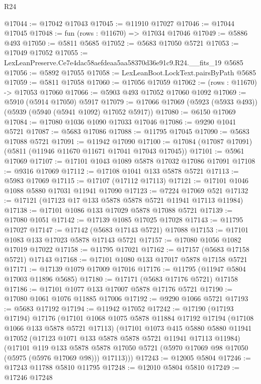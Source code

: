 \begin{lexlean}{R24}
\begin{coremodule}
@17044 := @17042 @17043
@17045 := @11910 @17027
@17046 := @17044 @17045
@17048 := fun (rows : @11670) => @17034 @17046
@17049 := @5886 @493
@17050 := @5811 @5685
@17052 := @5683 @17050 @5721
@17053 := @17049 @17052
@17055 := LexLeanPreserve.Ce7e4dac58aefdeaa5aa58370d36e91c9.R24.__fits_19 @5685
@17056 := @5892 @17055
@17058 := LexLeanBoot.LockText.pairsByPath @5685
@17059 := @5811 @17058
@17060 := @17056 @17059
@17062 := (rows : @11670) -> @17053 @17060
@17066 := @5903 @493 @17052 @17060 @1092
@17069 := @5910 (@5914 @17050) @5917
@17079 := @17066 @17069 (@5923 (@5933 @493)) (@5939 (@5940 (@5941 @1092) @17052 @5917))
@17080 := @6150 @17069
@17084 := @17080 @1036 @1090 @17033 @17046
@17086 := @9290 @1041 @5721
@17087 := @5683 @17086
@17088 := @11795 @17045
@17090 := @5683 @17088 @5721
@17091 := @11942 @17090
@17100 := @17084 (@17087 @17091) (@5811 (@11946 @11670 @11671 @17041 @17043 @17045))
@17101 := @5961 @17069
@17107 := @17101 @1043 @1089 @5878 @17032 @17086 @17091
@17108 := @9316 @17069
@17112 := @17108 @1041 @133 @5878 @5721
@17113 := @5983 @17069
@17115 := @17107 (@17112 @17113)
@17121 := @17101 @1046 @1088 @5880 @17031 @11941 @17090
@17123 := @7224 @17069 @521
@17132 := @17121 (@17123 @17 @133 @5878 @5878 @5721 @11941 @17113 @11984)
@17138 := @17101 @1086 @133 @17029 @5878 @17088 @5721
@17139 := @17080 @1051
@17142 := @17139 @1085 @17025 @17028
@17143 := @11795 @17027
@17147 := @17142 (@5683 @17143 @5721) @17088
@17153 := @17101 @1083 @133 @17023 @5878 @17143 @5721
@17157 := @17080 @1056 @1082 @17019 @17022
@17158 := @11795 @17021
@17162 := @17157 (@5683 @17158 @5721) @17143
@17168 := @17101 @1080 @133 @17017 @5878 @17158 @5721
@17171 := @17139 @1079 @17009 @17016
@17176 := @11795 (@11947 @5804 @17003 @11896 @5685)
@17180 := @17171 (@5683 @17176 @5721) @17158
@17186 := @17101 @1077 @133 @17007 @5878 @17176 @5721
@17190 := @17080 @1061 @1076 @11885 @17006
@17192 := @9290 @1066 @5721
@17193 := @5683 @17192
@17194 := @11942 @17052
@17242 := @17190
    (@17193 @17194)
    @17176
    (@17101
      @1068
      @1075
      @5878
      @11884
      @17192
      @17194
      (@17108 @1066 @133 @5878 @5721 @17113)
      (@17101
        @1073
        @415
        @5880
        @5880
        @11941
        @17052
        (@17123 @1071 @133 @5878 @5878 @5721 @11941 @17113 @11984)
        (@17101
          @119
          @133
          @5878
          @5878
          @17050
          @5721
          (@5970 @17069 @98 @17050 (@5975 (@5976 @17069 @98)))
          @17113)))
@17243 := @12005 @5804
@17246 := @17243 @11788 @5810 @11795
@17248 := @12010 @5804 @5810
@17249 := @17246 @17248

\end{coremodule}
\end{lexlean}
